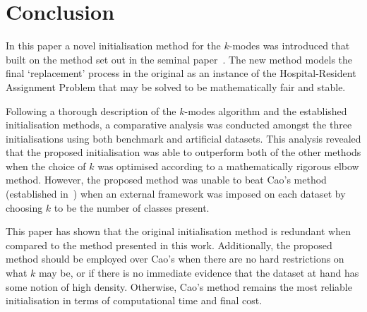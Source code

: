 \section{Conclusion}\label{sec:conclusion}

In this paper a novel initialisation method for the \(k\)-modes was introduced
that built on the method set out in the seminal paper~\cite{Huang1998}. The new
method models the final `replacement' process in the original as an instance of
the Hospital-Resident Assignment Problem that may be solved to be mathematically
fair and stable.

Following a thorough description of the \(k\)-modes algorithm and the
established initialisation methods, a comparative analysis was conducted amongst
the three initialisations using both benchmark and artificial datasets. This
analysis revealed that the proposed initialisation was able to outperform both
of the other methods when the choice of \(k\) was optimised according to a
mathematically rigorous elbow method. However, the proposed method was unable to
beat Cao's method (established in~\cite{Cao2009}) when an external framework was
imposed on each dataset by choosing \(k\) to be the number of classes present.

This paper has shown that the original initialisation method is redundant when
compared to the method presented in this work. Additionally, the proposed method
should be employed over Cao's when there are no hard restrictions on what \(k\)
may be, or if there is no immediate evidence that the dataset at hand has some
notion of high density. Otherwise, Cao's method remains the most reliable
initialisation in terms of computational time and final cost.
